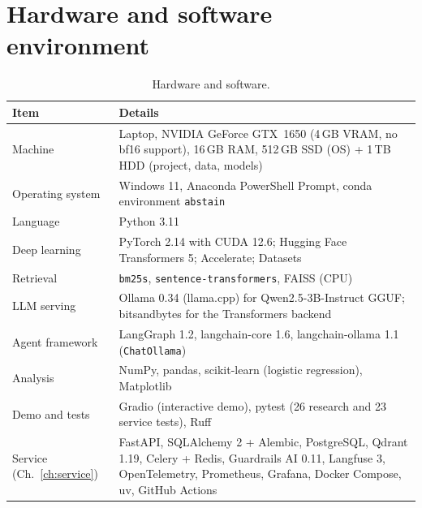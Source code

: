 \documentclass[11pt,a4paper]{report}
\begin{document}
\section{Hardware and software environment}
\begin{table}[H]
\centering\small
\begin{tabularx}{\textwidth}{@{}lY@{}}
\toprule
Item & Details \\
\midrule
Machine & Laptop, NVIDIA GeForce GTX~1650 (4\,GB VRAM, no bf16 support), 16\,GB RAM, 512\,GB SSD (OS) + 1\,TB HDD (project, data, models) \\
Operating system & Windows 11, Anaconda PowerShell Prompt, conda environment \texttt{abstain} \\
Language & Python 3.11 \\
Deep learning & PyTorch 2.14 with CUDA 12.6; Hugging Face Transformers 5; Accelerate; Datasets \\
Retrieval & \texttt{bm25s}, \texttt{sentence-transformers}, FAISS (CPU) \\
LLM serving & Ollama 0.34 (llama.cpp) for Qwen2.5-3B-Instruct GGUF; bitsandbytes for the Transformers backend \\
Agent framework & LangGraph 1.2, langchain-core 1.6, langchain-ollama 1.1 (\texttt{ChatOllama}) \\
Analysis & NumPy, pandas, scikit-learn (logistic regression), Matplotlib \\
Demo and tests & Gradio (interactive demo), pytest (26 research and 23 service tests), Ruff \\
Service (Ch.~\ref{ch:service}) & FastAPI, SQLAlchemy 2 + Alembic, PostgreSQL, Qdrant 1.19, Celery + Redis, Guardrails AI 0.11, Langfuse 3, OpenTelemetry, Prometheus, Grafana, Docker Compose, uv, GitHub Actions \\
\bottomrule
\end{tabularx}
\caption{Hardware and software.}
\end{table}
\end{document}
